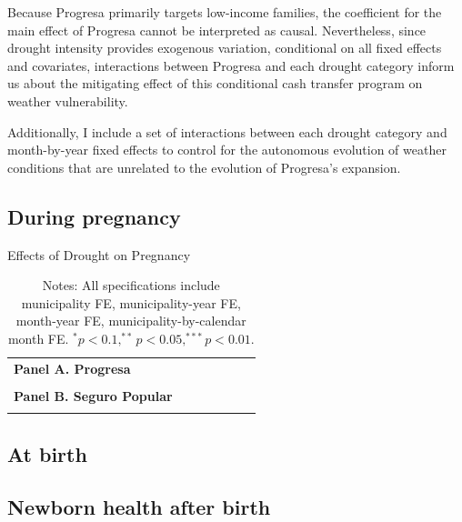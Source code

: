 \documentclass[12pt, oneside]{article}      %
\begin{document}
Because Progresa primarily targets low-income families, the coefficient for the main effect of Progresa cannot be interpreted as causal. Nevertheless, since drought intensity provides exogenous variation, conditional on all fixed effects and covariates, interactions between Progresa and each drought category inform us about the mitigating effect of this conditional cash transfer program on weather vulnerability.

Additionally, I include a set of interactions between each drought category and month-by-year fixed effects to control for the autonomous evolution of weather conditions that are unrelated to the evolution of Progresa's expansion.          


\subsection{During pregnancy}

\begin{table}[!ht]
\centering
\caption{Effects of Drought on Pregnancy}\label{tab:hospital_drought}
\fontsize{10pt}{12pt}\selectfont
\begin{tabular}{lcccccc}
\toprule
\textbf{Panel A. Progresa} & & & & & & \\
 \\
\midrule
\textbf{Panel B. Seguro Popular} & & & & & & \\
 \\
\bottomrule
\end{tabular}
\caption*{\footnotesize{Notes: All specifications include municipality FE, municipality-year FE, month-year FE, municipality-by-calendar month FE. $^* p<0.1, ^{**} p<0.05, ^{***} p<0.01$.}}
\end{table}


\subsection{At birth}




\subsection{Newborn health after birth}
\end{document}
